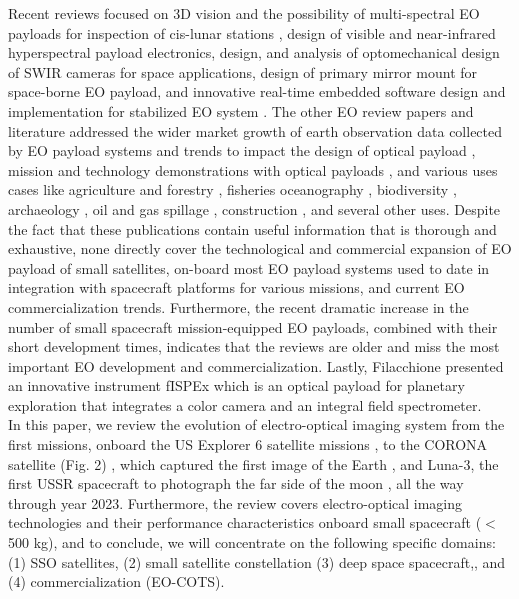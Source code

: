 \documentclass[final,5p,times,twocolumn,authoryear]{elsarticle}
\begin{document}
Recent reviews focused on 3D vision and the possibility of multi-spectral EO payloads for inspection of cis-lunar stations \citep{corpino2020inspection}, design of visible and near-infrared hyperspectral payload electronics, design, and analysis of optomechanical design of SWIR cameras for space applications, design of primary mirror mount for space-borne EO payload, and innovative real-time embedded software design and implementation for stabilized EO system \citep{sastry2020advances}. The other EO review papers and literature addressed the wider market growth of earth observation data collected by EO payload systems and trends to impact the design of optical payload \citep{cronje2023}, mission and technology demonstrations with optical payloads \citep{cho2019high, thatavarthi2020payload, willoughby1996hyperspectral, mughal2021aalto, swenson2015electro, prentice2021design}, and various uses cases like agriculture and forestry  \citep{boyd2005satellite, fahey2020active}, fisheries oceanography \cite{santos2000fisheries}, biodiversity \cite{turner2003remote}, archaeology \cite{giardino2011history}, oil and gas spillage \citep{fingas1997review}, construction \citep{teizer20083d}, and several other uses. Despite the fact that these publications contain useful information that is thorough and exhaustive, none directly cover the technological and commercial expansion of EO payload of small satellites, on-board most EO payload systems used to date in integration with spacecraft platforms for various missions, and current EO commercialization trends. Furthermore, the recent dramatic increase in the number of small spacecraft mission-equipped EO payloads, combined with their short development times, indicates that the reviews are older and miss the most important EO development and commercialization. Lastly,  Filacchione \citep{filacchione2022integral} presented an innovative instrument fISPEx which is an optical payload for planetary exploration that integrates a color camera and an integral field spectrometer.\\
In this paper, we review the evolution of electro-optical imaging system from the first missions, onboard the US Explorer 6 satellite missions \citep{christopherson20192019, judge1962observations}, to the CORONA satellite (Fig. 2) \citep{ruffner1995corona, altmaier2002digital, day1999eye, ur2003corona}, which captured the first image of the Earth \citep{house1986history}, and Luna-3, the first USSR spacecraft to photograph the far side of the moon \citep{siddiqi2018beyond}, all the way through year 2023. Furthermore, the review covers electro-optical imaging technologies and their performance characteristics onboard small spacecraft ($<$ 500 kg), and to conclude, we will concentrate on the following specific domains: (1) SSO satellites, (2) small satellite constellation (3) deep space spacecraft,, and (4) commercialization (EO-COTS).
\end{document}
